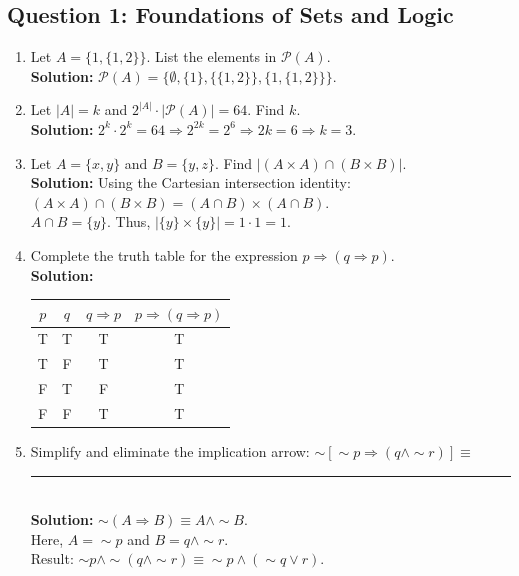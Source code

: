 \documentclass[11pt]{article}
\begin{document}
\subsection*{Question 1: Foundations of Sets and Logic}
\begin{enumerate}[label=(\roman*)]
    \item Let $A = \{1, \{1, 2\}\}$. List the elements in $\mathcal{P}(A)$.\\
    \textbf{Solution:} $\mathcal{P}(A) = \{\emptyset, \{1\}, \{\{1, 2\}\}, \{1, \{1, 2\}\}\}$.

    \item Let $|A| = k$ and $2^{|A|} \cdot |\mathcal{P}(A)| = 64$. Find $k$.\\
    \textbf{Solution:} $2^k \cdot 2^k = 64 \Rightarrow 2^{2k} = 2^6 \Rightarrow 2k = 6 \Rightarrow k = 3$.

    \item Let $A = \{x, y\}$ and $B = \{y, z\}$. Find $|(A \times A) \cap (B \times B)|$.\\
    \textbf{Solution:} Using the Cartesian intersection identity: $(A \times A) \cap (B \times B) = (A \cap B) \times (A \cap B)$. \\
    $A \cap B = \{y\}$. Thus, $|\{y\} \times \{y\}| = 1 \cdot 1 = 1$.

    \item Complete the truth table for the expression $p \Rightarrow (q \Rightarrow p)$.\\
    \textbf{Solution:}
    \begin{center}
    \begin{tabular}{|c|c|c|c|}
    \hline
    $p$ & $q$ & $q \Rightarrow p$ & $p \Rightarrow (q \Rightarrow p)$ \\
    \hline
    T & T & T & T \\
    T & F & T & T \\
    F & T & F & T \\
    F & F & T & T \\
    \hline
    \end{tabular}
    \end{center}

    \item Simplify and eliminate the implication arrow: $\sim[\sim p \Rightarrow (q \wedge \sim r)] \equiv$ \rule{3cm}{0.15mm}\\
    \textbf{Solution:} $\sim(A \Rightarrow B) \equiv A \wedge \sim B$. \\
    Here, $A = \sim p$ and $B = q \wedge \sim r$. \\
    Result: $\sim p \wedge \sim(q \wedge \sim r) \equiv \sim p \wedge (\sim q \vee r)$.


\end{enumerate}
\end{document}
